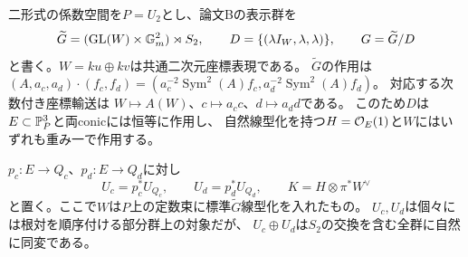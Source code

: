 二形式の係数空間を$P=U_2$とし、論文Bの表示群を
\[
 \widetilde G=(\operatorname{GL}(W)\times\mathbb G_m^2)\rtimes S_2,
 \qquad
 D=\{(\lambda I_W,\lambda,\lambda)\},
 \qquad G=\widetilde G/D
\]
と書く。$W=ku\oplus kv$は共通二次元座標表現である。
$\widetilde G$の作用は
$(A,a_c,a_d)\cdot(f_c,f_d)
 =(a_c^{-2}\operatorname{Sym}^2(A)f_c,
   a_d^{-2}\operatorname{Sym}^2(A)f_d)$。
対応する次数付き座標輸送は
$W\mapsto A(W)$、$c\mapsto a_c c$、$d\mapsto a_d d$である。
このため$D$は$E\subset\mathbb P^3_P$と両conicには恒等に作用し、
自然線型化を持つ$H=\mathcal O_E(1)$と$W$にはいずれも重み一で作用する。

$p_c:E\to Q_c$、$p_d:E\to Q_d$に対し
\[
 U_c=p_c^*U_{Q_c},\qquad U_d=p_d^*U_{Q_d},\qquad
 K=H\otimes\pi^*W^\vee
\]
と置く。ここで$W$は$P$上の定数束に標準$\widetilde G$線型化を入れたもの。
$U_c,U_d$は個々には根対を順序付ける部分群上の対象だが、
$U_c\oplus U_d$は$S_2$の交換を含む全群に自然に同変である。

